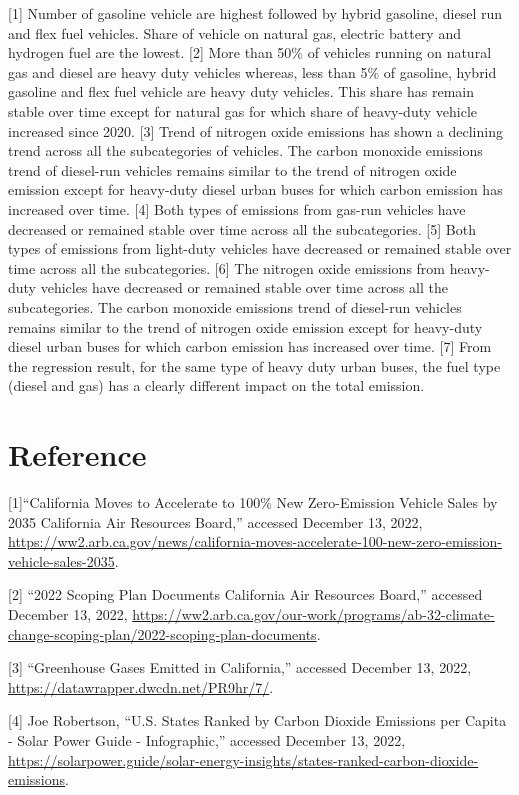 \documentclass[
  12pt,
]{article}
\begin{document}
{[}1{]} Number of gasoline vehicle are highest followed by hybrid
gasoline, diesel run and flex fuel vehicles. Share of vehicle on natural
gas, electric battery and hydrogen fuel are the lowest. {[}2{]} More
than 50\% of vehicles running on natural gas and diesel are heavy duty
vehicles whereas, less than 5\% of gasoline, hybrid gasoline and flex
fuel vehicle are heavy duty vehicles. This share has remain stable over
time except for natural gas for which share of heavy-duty vehicle
increased since 2020. {[}3{]} Trend of nitrogen oxide emissions has
shown a declining trend across all the subcategories of vehicles. The
carbon monoxide emissions trend of diesel-run vehicles remains similar
to the trend of nitrogen oxide emission except for heavy-duty diesel
urban buses for which carbon emission has increased over time. {[}4{]}
Both types of emissions from gas-run vehicles have decreased or remained
stable over time across all the subcategories. {[}5{]} Both types of
emissions from light-duty vehicles have decreased or remained stable
over time across all the subcategories. {[}6{]} The nitrogen oxide
emissions from heavy-duty vehicles have decreased or remained stable
over time across all the subcategories. The carbon monoxide emissions
trend of diesel-run vehicles remains similar to the trend of nitrogen
oxide emission except for heavy-duty diesel urban buses for which carbon
emission has increased over time. {[}7{]} From the regression result,
for the same type of heavy duty urban buses, the fuel type (diesel and
gas) has a clearly different impact on the total emission.

\newpage

\hypertarget{reference}{%
\section{Reference}\label{reference}}

{[}1{]}``California Moves to Accelerate to 100\% New Zero-Emission
Vehicle Sales by 2035 \textbar{} California Air Resources Board,''
accessed December 13, 2022,
\url{https://ww2.arb.ca.gov/news/california-moves-accelerate-100-new-zero-emission-vehicle-sales-2035}.

{[}2{]} ``2022 Scoping Plan Documents \textbar{} California Air
Resources Board,'' accessed December 13, 2022,
\url{https://ww2.arb.ca.gov/our-work/programs/ab-32-climate-change-scoping-plan/2022-scoping-plan-documents}.

{[}3{]} ``Greenhouse Gases Emitted in California,'' accessed December
13, 2022, \url{https://datawrapper.dwcdn.net/PR9hr/7/}.

{[}4{]} Joe Robertson, ``U.S. States Ranked by Carbon Dioxide Emissions
per Capita - Solar Power Guide - Infographic,'' accessed December 13,
2022,
\url{https://solarpower.guide/solar-energy-insights/states-ranked-carbon-dioxide-emissions}.
\end{document}
